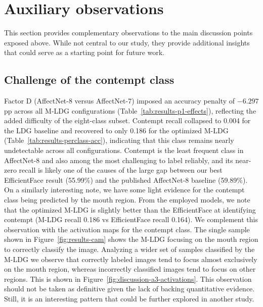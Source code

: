 \section{Auxiliary observations}
\label{section:discussion-auxiliary}

This section provides complementary observations to the main discussion points exposed above. While not central to our study, they provide additional insights that could serve as a starting point for future work.

\subsection{Challenge of the contempt class}
\label{section:discussion-a3}

Factor D (AffectNet-8 versus AffectNet-7) imposed an accuracy penalty of $-6.297$ pp across all M-LDG configurations (Table~\ref{tab:results-p1-effects}), reflecting the added difficulty of the eight-class subset. Contempt recall collapsed to 0.004 for the LDG baseline and recovered to only 0.186 for the optimized M-LDG (Table~\ref{tab:results-perclass-acc}), indicating that this class remains nearly undetectable across all configurations. Contempt is the least frequent class in AffectNet-8 and also among the most challenging to label reliably, and its near-zero recall is likely one of the causes of the large gap between our best EfficientFace result (55.99\%) and the published AffectNet-8 baseline (59.89\%).\\

On a similarly interesting note, we have some light evidence for the contempt class being predicted by the mouth region. From the employed models, we note that the optimized M-LDG is slightly better than the EfficientFace at identifying contempt (M-LDG recall 0.186 vs EfficientFace recall 0.164). We complement this observation with the activation maps for the contempt class. The single sample shown in Figure~\ref{fig:results-cam} shows the M-LDG focusing on the mouth region to correctly classify the image. Analyzing a wider set of samples classified by the M-LDG we observe that correctly labeled images tend to focus almost exclusively on the mouth region, whereas incorrectly classified images tend to focus on other regions. This is shown in Figure~\ref{fig:discussion-a3-activations}. This observation should not be taken as definitive given the lack of backing quantitative evidence. Still, it is an interesting pattern that could be further explored in another study.

